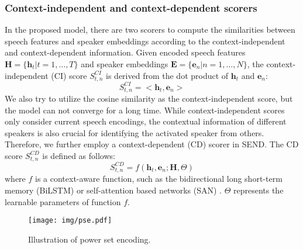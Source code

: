 \documentclass[a4paper]{article}
\begin{document}
\subsubsection{Context-independent and context-dependent scorers}
In the proposed model, there are two scorers to compute the similarities between speech features and speaker embeddings according to the context-independent and context-dependent information.
Given encoded speech features $\mathbf{H}=\{\mathbf{h}_t|t=1,\dots,T\}$ and speaker embeddings $\mathbf{E}=\{\mathbf{e}_n|n=1,\dots,N\}$, the context-independent (CI) score $S^{CI}_{t,n}$ is derived from the dot product of $\mathbf{h}_t$ and $\mathbf{e}_n$:
\begin{equation}
	S^{CI}_{t,n}=<\mathbf{h}_t, \mathbf{e}_n>
\end{equation}
We also try to utilize the cosine similarity as the context-independent score, but the model can not converge for a long time.
While context-independent scores only consider current speech encodings, the contextual information of different speakers is also crucial for identifying the activated speaker from others.
Therefore, we further employ a context-dependent (CD) scorer in SEND. The CD score $S^{CD}_{t,n}$ is defined as follows:
\begin{equation}
	S^{CD}_{t,n} = f(\mathbf{h}_t, \mathbf{e}_n;\mathbf{H},\Theta)
\end{equation}
where $f$ is a context-aware function, such as the bidirectional long short-term memory (BiLSTM) \cite{hochreiter1997long} or self-attention based networks (SAN) \cite{VaswaniSPUJGKP17}.
$\Theta$ represents the learnable parameters of function $f$.
\begin{figure}[t!]
	\centering
	\texttt{[image: img/pse.pdf]}
	\caption{Illustration of power set encoding.}
	\label{fig:pse}
\end{figure}
\end{document}
